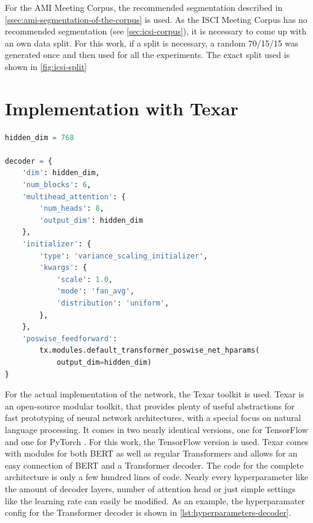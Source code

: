 For the AMI Meeting Corpus, the recommended segmentation described in \cref{ssec:ami-segmentation-of-the-corpus} is used.
As the ISCI Meeting Corpus has no recommended segmentation (see \cref{sec:icsi-corpus}), it is necessary to come up with an own data split.
For this work, if a split is necessary, a random 70/15/15 was generated once and then used for all the experiments.
The exact split used is shown in \cref{fig:icsi-split}


\section{Implementation with Texar}

\begin{lstlisting}[numbers=none,language=Python,caption={Hyperparameters for Transformer decoder},captionpos=b,label=lst:hyperparameters-decoder]
hidden_dim = 768

decoder = {
    'dim': hidden_dim,
    'num_blocks': 6,
    'multihead_attention': {
        'num_heads': 8,
        'output_dim': hidden_dim
    },
    'initializer': {
        'type': 'variance_scaling_initializer',
        'kwargs': {
            'scale': 1.0,
            'mode': 'fan_avg',
            'distribution': 'uniform',
        },
    },
    'poswise_feedforward': 
        tx.modules.default_transformer_poswise_net_hparams(
            output_dim=hidden_dim)
}
\end{lstlisting}

For the actual implementation of the network, the Texar toolkit \cite{hu2019texar} is used.
Texar is an open-source modular toolkit, that provides plenty of useful abstractions for fast prototyping of neural network architectures, with a special focus on natural language processing.
It comes in two nearly identical versions, one for TensorFlow \cite{tensorflow2015-whitepaper} and one for PyTorch \cite{NEURIPS2019_9015}.  
For this work, the TensorFlow version is used.
Texar comes with modules for both BERT as well as regular Transformers and allows for an easy connection of BERT and a Transformer decoder.
The code for the complete architecture is only a few hundred lines of code.
Nearly every hyperparameter like the amount of decoder layers, number of attention head or just simple settings like the learning rate can easily be modified.
As an example, the hyperparamater config for the Transformer decoder is shown in \cref{lst:hyperparameters-decoder}.

